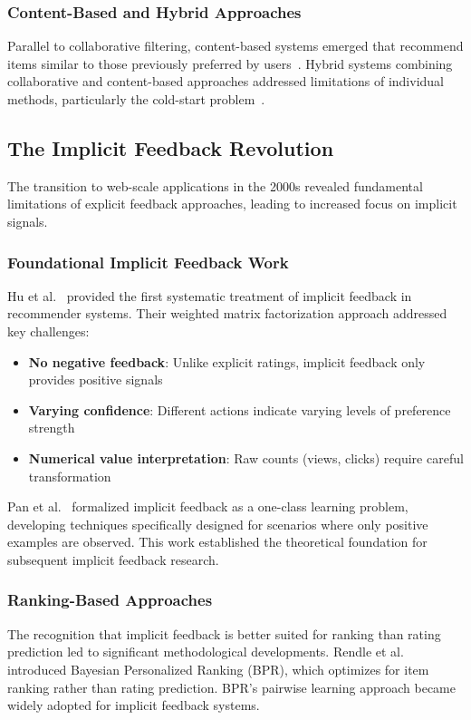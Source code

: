 \subsubsection{Content-Based and Hybrid Approaches}
Parallel to collaborative filtering, content-based systems emerged that recommend items similar to those previously preferred by users~\cite{pazzani2007content}. Hybrid systems combining collaborative and content-based approaches addressed limitations of individual methods, particularly the cold-start problem~\cite{burke2002hybrid,adomavicius2005toward}.

\subsection{The Implicit Feedback Revolution}

The transition to web-scale applications in the 2000s revealed fundamental limitations of explicit feedback approaches, leading to increased focus on implicit signals.

\subsubsection{Foundational Implicit Feedback Work}
Hu et al.~\cite{hu2008collaborative} provided the first systematic treatment of implicit feedback in recommender systems. Their weighted matrix factorization approach addressed key challenges:
\begin{itemize}
    \item \textbf{No negative feedback}: Unlike explicit ratings, implicit feedback only provides positive signals
    \item \textbf{Varying confidence}: Different actions indicate varying levels of preference strength
    \item \textbf{Numerical value interpretation}: Raw counts (views, clicks) require careful transformation
\end{itemize}

Pan et al.~\cite{pan2008one} formalized implicit feedback as a one-class learning problem, developing techniques specifically designed for scenarios where only positive examples are observed. This work established the theoretical foundation for subsequent implicit feedback research.

\subsubsection{Ranking-Based Approaches}
The recognition that implicit feedback is better suited for ranking than rating prediction led to significant methodological developments. Rendle et al.~\cite{rendle2009bpr} introduced Bayesian Personalized Ranking (BPR), which optimizes for item ranking rather than rating prediction. BPR's pairwise learning approach became widely adopted for implicit feedback systems.

